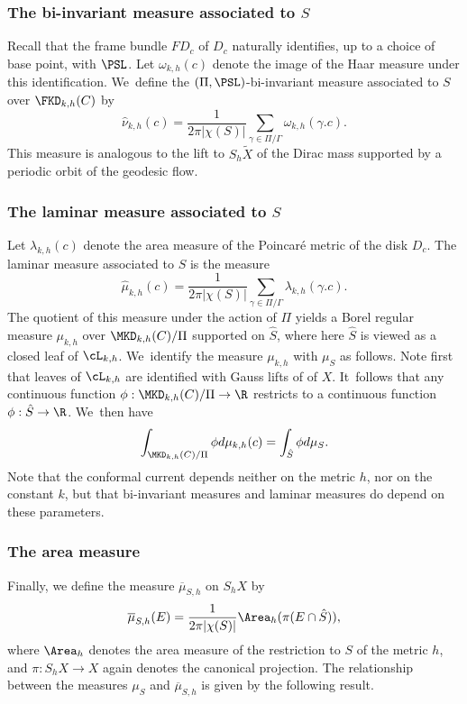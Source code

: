 \subsubsection*{The bi-invariant measure associated to $S$}
Recall that the frame bundle $FD_c$ of $D_c$ naturally identifies, up to a choice of base point, with $\PSL$. Let $\omega_{k,h}(c)$ denote the image of the Haar measure under this identification. We~define the $(\Pi,\PSL)$-bi-invariant measure associated to $S$ over $\FKD_{k,h}(C)$ by
\begin{equation*}
\hat\nu_{k,h}(c)=\frac{1}{2\pi|\chi(S)|}\sum_{\gamma\in\Pi/\Gamma}\omega_{k,h}(\gamma.c).
\end{equation*}
This measure is analogous to the lift to $S_h \tilde X$ of the Dirac mass supported by a periodic orbit of the geodesic flow.

\subsubsection*{The laminar measure associated to $S$} Let $\lambda_{k,h}(c)$ denote the area measure of the Poincaré metric of the disk $D_c$. The laminar measure associated to $S$ is the measure
\begin{equation*}
\hat\mu_{k,h}(c)=\frac{1}{2\pi|\chi(S)|}\sum_{\gamma\in\Pi/\Gamma}\lambda_{k,h}(\gamma.c).
\end{equation*}
The quotient of this measure under the action of $\Pi$ yields a Borel regular measure $\mu_{k,h}$ over $\MKD_{k,h}(C)/\Pi$ supported on $\hat S$, where here $\hat S$ is viewed as a closed leaf of $\cL_{k,h}$. We~identify the measure $\mu_{k,h}$ with $\mu_S$ as follows. Note first that leaves of $\cL_{k,h}$ are identified with Gauss lifts of \ksurfaces of $X$. It~follows that any continuous function $\phi:\MKD_{k,h}(C)/\Pi\to\R$ restricts to a continuous function $\phi:\hat S\to\R$. We~then have
\begin{equation}\label{eq.ident_measures}
\int_{\MKD_{k,h}(C)/\Pi} \phi d\mu_{k,h}(c)=\int_{\hat S}\phi d\mu_S.
\end{equation}
Note that the conformal current depends neither on the metric $h$, nor on the constant $k$, but that bi-invariant measures and laminar measures do depend on these parameters.

\subsubsection*{The area measure} Finally, we define the measure $\overline{\mu}_{S,h}$ on $S_hX$ by
\begin{equation}\label{eq.area_measure}
\overline{\mu}_{S,h}(E)=\frac{1}{2\pi|\chi(S)|}\Area_h(\pi(E\cap\hat S)),
\end{equation}
where $\Area_h$ denotes the area measure of the restriction to $S$ of the metric $h$, and $\pi:S_hX\to X$ again denotes the canonical projection. The relationship between the measures $\mu_S$ and $\overline\mu_{S,h}$ is given by the following result.


